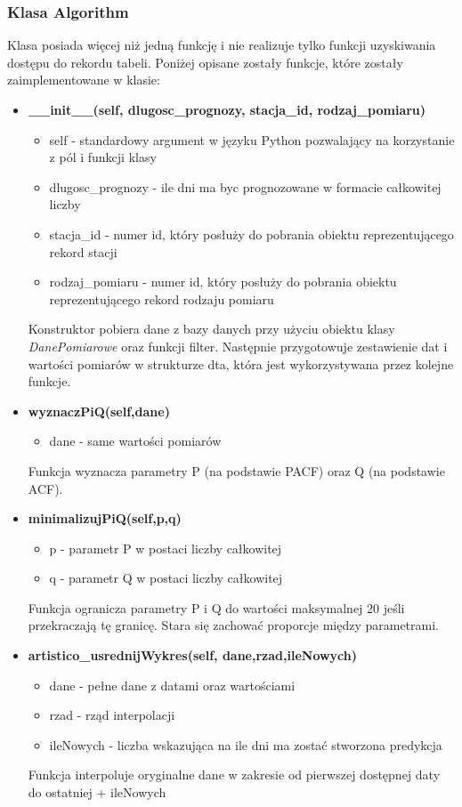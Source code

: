 \subsubsection{Klasa Algorithm}
Klasa posiada więcej niż jedną funkcję i nie realizuje tylko funkcji uzyskiwania dostępu do rekordu tabeli. 
Poniżej opisane zostały funkcje, które zostały zaimplementowane w klasie:
\begin{itemize}
	\item \textbf{\_\_init\_\_(self, dlugosc\_prognozy, stacja\_id, rodzaj\_pomiaru)}
	\begin{itemize}
		\item self - standardowy argument w języku Python pozwalający na korzystanie z pól i funkcji klasy
		\item dlugosc\_prognozy - ile dni ma byc prognozowane w formacie całkowitej liczby
		\item stacja\_id - numer id, który posłuży do pobrania obiektu reprezentującego rekord stacji
		\item rodzaj\_pomiaru - numer id, który posłuży do pobrania obiektu reprezentującego rekord rodzaju pomiaru
	\end{itemize}
	Konstruktor pobiera dane z bazy danych przy użyciu obiektu klasy \textit{DanePomiarowe} oraz funkcji filter. Następnie przygotowuje zestawienie dat i wartości pomiarów w strukturze dta, która jest wykorzystywana przez kolejne funkcje. 

	\item \textbf{wyznaczPiQ(self,dane)}
	\begin{itemize}
		\item dane - same wartości pomiarów
	\end{itemize}
	Funkcja wyznacza parametry P (na podstawie PACF) oraz Q (na podstawie ACF). 

	\item \textbf{minimalizujPiQ(self,p,q)}
	\begin{itemize}
		\item p - parametr P w postaci liczby całkowitej
		\item q - parametr Q w postaci liczby całkowitej
	\end{itemize}
	Funkcja ogranicza parametry P i Q do wartości maksymalnej 20 jeśli przekraczają tę granicę. Stara się zachować proporcje między parametrami. 

	\item \textbf{artistico\_usrednijWykres(self, dane,rzad,ileNowych)}
	\begin{itemize}
		\item dane - pełne dane z datami oraz wartościami
		\item rzad - rząd interpolacji
		\item ileNowych - liczba wskazująca na ile dni ma zostać stworzona predykcja
	\end{itemize}
	Funkcja interpoluje oryginalne dane w zakresie od pierwszej dostępnej daty do ostatniej + ileNowych


\end{itemize}
